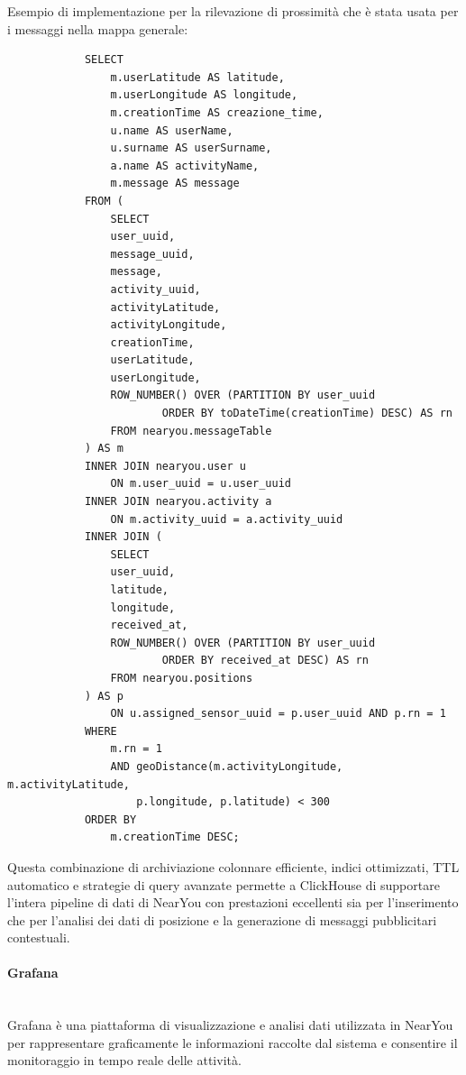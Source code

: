 \documentclass[10pt]{article}
\newcommand{\myparagraph}[1]{\paragraph{#1}\mbox{}\\}
\begin{document}
        Esempio di implementazione per la rilevazione di prossimità che è stata usata per i messaggi nella mappa generale:
            \begin{lstlisting}
            SELECT
                m.userLatitude AS latitude,
                m.userLongitude AS longitude,
                m.creationTime AS creazione_time,
                u.name AS userName,
                u.surname AS userSurname,
                a.name AS activityName,
                m.message AS message
            FROM (
                SELECT
                user_uuid,
                message_uuid,
                message,
                activity_uuid,
                activityLatitude,
                activityLongitude,
                creationTime,
                userLatitude,
                userLongitude,
                ROW_NUMBER() OVER (PARTITION BY user_uuid
                        ORDER BY toDateTime(creationTime) DESC) AS rn
                FROM nearyou.messageTable
            ) AS m
            INNER JOIN nearyou.user u
                ON m.user_uuid = u.user_uuid
            INNER JOIN nearyou.activity a
                ON m.activity_uuid = a.activity_uuid
            INNER JOIN (
                SELECT
                user_uuid,
                latitude,
                longitude,
                received_at,
                ROW_NUMBER() OVER (PARTITION BY user_uuid
                        ORDER BY received_at DESC) AS rn
                FROM nearyou.positions
            ) AS p
                ON u.assigned_sensor_uuid = p.user_uuid AND p.rn = 1
            WHERE
                m.rn = 1
                AND geoDistance(m.activityLongitude, m.activityLatitude,
                    p.longitude, p.latitude) < 300
            ORDER BY
                m.creationTime DESC;
            \end{lstlisting}

        Questa combinazione di archiviazione colonnare efficiente, indici ottimizzati, TTL automatico e strategie di query avanzate permette a ClickHouse di supportare l'intera pipeline di dati di NearYou con prestazioni eccellenti sia per l'inserimento che per l'analisi dei dati di posizione e la generazione di messaggi pubblicitari contestuali.

        \myparagraph{Grafana}
        Grafana è una piattaforma di visualizzazione e analisi dati utilizzata in NearYou per rappresentare graficamente le informazioni raccolte dal sistema e consentire il monitoraggio in tempo reale delle attività.
\end{document}
